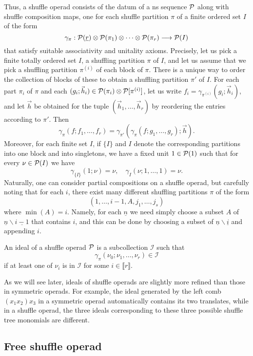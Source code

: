 Thus, a shuffle operad consists of the
datum of a ns sequence ${\mathcal{P}}$ along with
shuffle composition maps, one for each
shuffle partition $\pi$ of a finite ordered
set $I$ of the form
\[
\gamma_\pi : {\mathcal{P}}(\underline{r})\otimes
		{\mathcal{P}}(\pi_1)\otimes\cdots\otimes{\mathcal{P}}(\pi_r)
		 	\longrightarrow {\mathcal{P}}(I)
\]
that satisfy suitable associativity and
unitality axioms. Precisely, let us pick
a finite totally ordered set $I$,
a shuffling partition $\pi$ of $I$,
and let us assume that we pick a shuffling
partition $\pi^{(i)}$ of each block of $\pi$.
There is a unique way to order the collection
of blocks of these to obtain a shuffling
partition $\pi'$ of $I$.
For each part $\pi_i$ of $\pi$
and each $(g_i;\vec{h}_i) \in {\mathcal{P}}(\pi_i)\otimes
{\mathcal{P}}[\pi^{(i)}]$, let us write
$f_i = \gamma_{\pi^{(i)}}(g_i;\vec{h}_i)$,
and let $\vec{h}$ be obtained for the
tuple $(\vec{h}_1,\ldots,\vec{h}_r)$
by reordering the entries according to $\pi'$.
Then
\[ 
\gamma_\pi(f ; f_1,\ldots,f_r) =
 \gamma_{\pi'}(\gamma_\pi(f;g_1,
 \ldots,g_r); \vec{h} ).
	\]
Moreover, for each finite set $I$,
if $\{I\}$ and $I$ denote the corresponding
partitions into one block and into singletons,
we have a fixed unit $1\in {\mathcal{P}}(1)$ such that for
every $\nu\in{\mathcal{P}}(I)$ we have
\[ \gamma_{\{I\}}(1;\nu) = \nu , 
\quad  \gamma_I(\nu ; 1,\ldots,1 ) = 
\nu.\]
Naturally, one can consider partial compositions
on a shuffle operad, but carefully noting that
for each $i$, there exist many different
shuffling partitions $\pi$ of the form
\[
 (1,\ldots,i-1,A,j_1,\ldots,j_s)
 	\]
 where $\min(A) = i$. Namely, for each
 $\underline{n}$ we need simply choose a subset 
 $A$ of $\underline{n}\smallsetminus \underline{i-1}$ that contains
 $i$, and this can be done by choosing a subset
 of $\underline{n}\smallsetminus \underline{i}$ and appending 
 $i$. 
\begin{definition}
An ideal of a shuffle operad ${\mathcal{P}}$ is a
subcollection $\mathcal{I}$ such that
\[ \gamma_\pi(\nu_0;\nu_1,\ldots,\nu_r)\in 
\mathcal{I}\] if at least one of $\nu_i$
is in $\mathcal{I}$ for some $i\in \llbracket r\rrbracket$.
\end{definition}

As we will see later, ideals of shuffle operads
are slightly more refined than those in
symmetric operads. For example, the ideal 
generated by the left comb $(x_1x_2)x_3$
in a symmetric operad
automatically contains its two translates,
while in a shuffle operad, the three ideals
corresponding to these three possible shuffle
tree monomials are different. 

\subsection{Free shuffle operad}

